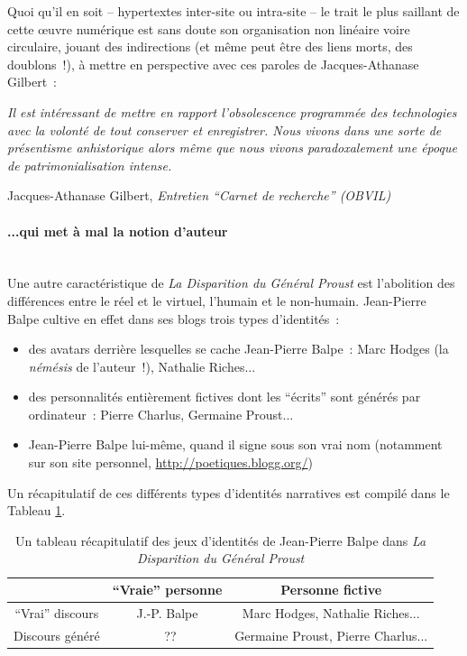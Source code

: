 \documentclass{article}
\newcommand{\subsubsubsection}[1]{\paragraph{#1}\mbox{}\\}
\newenvironment{citationbox}
{\begin{center}
		\begin{minipage}{.8\textwidth}
		}
		{
		\end{minipage}	
\end{center}
}
\begin{document}
					Quoi qu'il en soit -- hypertextes inter-site ou intra-site -- le trait le plus saillant de cette œuvre numérique est sans doute son organisation non linéaire voire circulaire, jouant des indirections (et même peut être des liens morts, des doublons~!), à mettre en perspective avec ces paroles de Jacques-Athanase Gilbert~:
					\begin{citationbox}
						\textit{Il est intéressant de mettre en rapport l’obsolescence programmée des technologies avec la volonté de tout conserver et enregistrer. Nous vivons dans une sorte de présentisme anhistorique alors même que nous vivons paradoxalement une époque de patrimonialisation intense.}
						\begin{flushright}
							Jacques-Athanase Gilbert, \textit{Entretien ``Carnet de recherche'' (OBVIL)} \cite{gilbert2018}
						\end{flushright}
					\end{citationbox}
				\subsubsubsection{...qui met à mal la notion d'auteur}
					Une autre caractéristique de \textit{La Disparition du Général Proust} est l'abolition des différences entre le réel et le virtuel, l'humain et le non-humain. Jean-Pierre Balpe cultive en effet dans ses blogs trois types d'identités~:
					\vspace{2mm}
					\begin{itemize}
						\item des avatars derrière lesquelles se cache Jean-Pierre Balpe : Marc Hodges (la \textit{némésis} de l'auteur~!), Nathalie Riches...
						\item des personnalités entièrement fictives dont les ``écrits'' sont générés par ordinateur : Pierre Charlus, Germaine Proust...
						\item Jean-Pierre Balpe lui-même, quand il signe sous son vrai nom (notamment sur son site personnel, \href{http://poetiques.blogg.org/}{http://poetiques.blogg.org/})
					\end{itemize}
					\vspace{2mm}
					Un récapitulatif de ces différents types d'identités narratives est compilé dans le Tableau \ref{tab:balpe_identites}.
					\begin{table}
						\centering
						\begin{tabular}{c | c c}
							&``Vraie'' personne & Personne fictive \\ \hline
							``Vrai'' discours & J.-P. Balpe & Marc Hodges, Nathalie Riches...\\
							Discours généré &~?? & Germaine Proust, Pierre Charlus...
						\end{tabular}
						\caption{Un tableau récapitulatif des jeux d'identités de Jean-Pierre Balpe dans \textit{La Disparition du Général Proust}}
						\label{tab:balpe_identites}
					\end{table}
\end{document}
